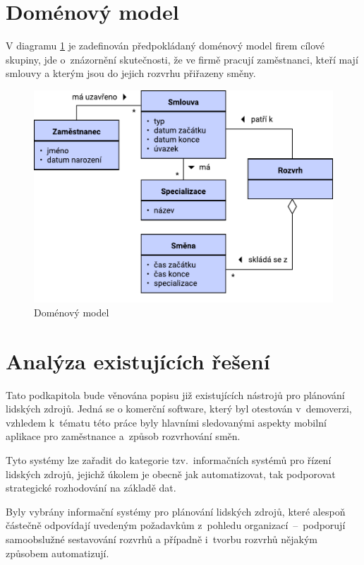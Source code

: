 \documentclass[twoside]{ctuthesis}
\begin{document}
\section{Doménový model}

V diagramu \ref{fig:domainmodel} je zadefinován předpokládaný doménový model firem cílové skupiny, jde o~znázornění skutečnosti, že ve firmě pracují zaměstnanci, kteří mají smlouvy a kterým jsou do jejich rozvrhu přiřazeny směny.

\begin{figure}[h]
	\includegraphics[scale=0.7]{img/domain-model.pdf}
	\caption{Doménový model}
	\label{fig:domainmodel}
\end{figure}

\section{Analýza existujících řešení}
\label{sec:existing}
Tato podkapitola bude věnována popisu již existujících nástrojů pro plánování lidských zdrojů. Jedná se o komerční software, který byl otestován v~demoverzi, vzhledem k~tématu této práce byly hlavními sledovanými aspekty mobilní aplikace pro zaměstnance a~způsob rozvrhování směn.

Tyto systémy lze zařadit do kategorie tzv.~informačních systémů pro řízení lidských zdrojů, jejichž úkolem je obecně jak automatizovat, tak podporovat strategické rozhodování na základě dat. \cite{kovach2002administrative}

Byly vybrány informační systémy pro plánování lidských zdrojů, které alespoň částečně odpovídají uvedeným požadavkům z~pohledu organizací~–~podporují samoobslužné sestavování rozvrhů a případně i~tvorbu rozvrhů nějakým způsobem automatizují.
\end{document}
